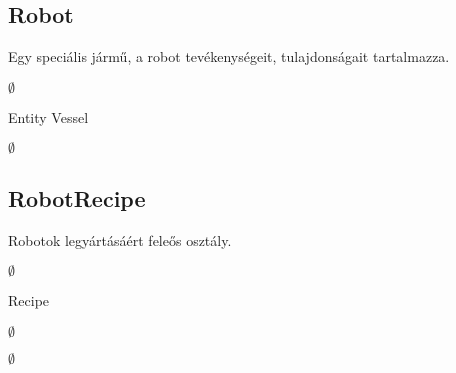 \subsection{Robot}
\begin{class-template-responsibility}
Egy speciális jármű, a robot tevékenységeit, tulajdonságait tartalmazza.
\end{class-template-responsibility}
\begin{class-template-interface}
$\emptyset$
\end{class-template-interface}
\begin{class-template-baseclass}
Entity \baseclass Vessel
\end{class-template-baseclass}
\begin{class-template-attribute}
\item[] $\emptyset$
\end{class-template-attribute}
\begin{class-template-method}
\end{class-template-method}


\subsection{RobotRecipe}
\begin{class-template-responsibility}
Robotok legyártásáért feleős osztály.
\end{class-template-responsibility}
\begin{class-template-interface}
$\emptyset$
\end{class-template-interface}
\begin{class-template-baseclass}
Recipe
\end{class-template-baseclass}
\begin{class-template-attribute}
\item[] $\emptyset$
\end{class-template-attribute}
\begin{class-template-method}
\item[] $\emptyset$
\end{class-template-method}


